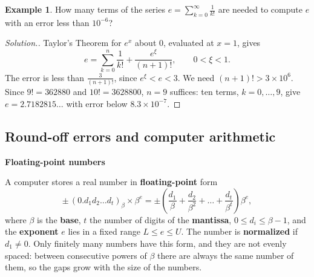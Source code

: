 \documentclass[11pt,a4paper]{article}
\numberwithin{equation}{section}
\theoremstyle{definition}
\newtheorem{exa}[thm]{Example}
\newenvironment{solution}
  {\renewcommand{\qedsymbol}{}\begin{proof}[\textit{Solution}.]}
  {\end{proof}}
\newcommand{\subhead}[1]{%
  \par\medskip\noindent\textbf{#1}\par\nobreak\smallskip}
\begin{document}
\begin{exa}
How many terms of the series $e = \sum_{k=0}^\infty\frac{1}{k!}$ are needed to compute $e$ with an error less than $10^{-6}$?
\end{exa}

\begin{solution}
Taylor's Theorem for $e^x$ about $0$, evaluated at $x=1$, gives
$$e = \sum_{k=0}^n\frac{1}{k!} + \frac{e^{\xi}}{(n+1)!}, \qquad 0<\xi<1.$$
The error is less than $\frac{3}{(n+1)!}$, since $e^\xi<e<3$. We need $(n+1)!>3\times10^6$. Since $9! = 362880$ and $10! = 3628800$,
$n = 9$ suffices: ten terms, $k = 0,\dots,9$, give $e = 2.7182815\ldots$ with error below $8.3\times10^{-7}$.
\end{solution}


\subsection{Round-off errors and computer arithmetic}
\label{sec:fp}

\subhead{Floating-point numbers}
A computer stores a real number in \textbf{floating-point} form
$$\pm\,(0.d_1d_2\ldots d_t)_\beta\times\beta^{e} = \pm\left(\frac{d_1}{\beta}+\frac{d_2}{\beta^2}+\dots+\frac{d_t}{\beta^t}\right)\beta^e,$$
where $\beta$ is the \textbf{base}, $t$ the number of digits of the \textbf{mantissa}, $0\leq d_i\leq\beta-1$, and the \textbf{exponent} $e$
lies in a fixed range $L\leq e\leq U$. The number is \textbf{normalized} if $d_1\neq0$. Only finitely many numbers have this form, and
they are not evenly spaced: between consecutive powers of $\beta$ there are always the same number of them, so the gaps grow with the
size of the numbers.
\end{document}
